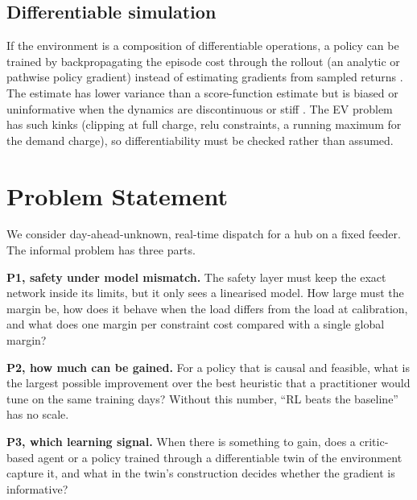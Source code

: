 \documentclass[11pt]{article}
\begin{document}
\subsection{Differentiable simulation}
If the environment is a composition of differentiable operations, a policy can be trained by backpropagating the episode cost through the rollout (an analytic or pathwise policy gradient) instead of estimating gradients from sampled returns \cite{heess,shac}. The estimate has lower variance than a score-function estimate but is biased or uninformative when the dynamics are discontinuous or stiff \cite{suh,metz}. The EV problem has such kinks (clipping at full charge, relu constraints, a running maximum for the demand charge), so differentiability must be checked rather than assumed.

\section{Problem Statement}
We consider day-ahead-unknown, real-time dispatch for a hub on a fixed feeder. The informal problem has three parts.

\textbf{P1, safety under model mismatch.} The safety layer must keep the exact network inside its limits, but it only sees a linearised model. How large must the margin be, how does it behave when the load differs from the load at calibration, and what does one margin per constraint cost compared with a single global margin?

\textbf{P2, how much can be gained.} For a policy that is causal and feasible, what is the largest possible improvement over the best heuristic that a practitioner would tune on the same training days? Without this number, ``RL beats the baseline'' has no scale.

\textbf{P3, which learning signal.} When there is something to gain, does a critic-based agent or a policy trained through a differentiable twin of the environment capture it, and what in the twin's construction decides whether the gradient is informative?

\end{document}
